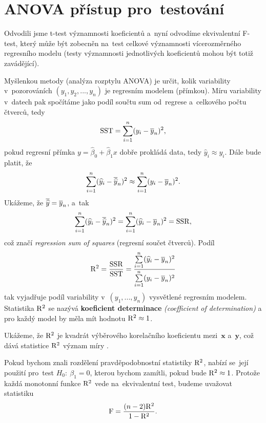 \section{ANOVA přístup pro~testování}
Odvodili jsme t-test významnosti koeficientů a~nyní odvodíme ekvivalentní F-test, který může být zobecněn na~test celkové významnosti vícerozměrného regresního modelu (testy významnosti jednotlivých koeficientů mohou být totiž zavádějící).

Myšlenkou metody (analýza rozptylu ANOVA) je určit, kolik variability v~pozorováních $(y_1,y_2,...,y_n)$ je  regresním modelem (přímkou). Míru variability v~datech pak spočítáme jako podíl součtu sum od~regrese a~celkového počtu čtverců, tedy
 $$ \mathrm{SST} = \sum\limits_{i=1}^{n}(y_i-\overline{y}_n)^2, $$
pokud regresní přímka $y = \widehat{\beta}_0+\widehat{\beta}_1 x$ dobře prokládá data, tedy $\widehat{y}_i\approx y_i$. Dále bude platit, že
 $$ \sum\limits_{i=1}^{n} (\widehat{y}_i-\overline{\widehat{y}}_n)^2\approx\sum\limits_{i=1}^{n} (y_i-\overline{y}_n)^2. $$
Ukážeme, že $\overline{\widehat{y}} = \overline{y}_n$, a~tak
 $$ \sum\limits_{i=1}^{n} (\widehat{y}_i-\overline{\widehat{y}}_n)^2 = \sum\limits_{i=1}^{n} (\widehat{y}_i-\overline{y}_n)^2 = \mathrm{SSR}, $$ což značí \textit{regression sum of squares} (regresní součet čtverců). Podíl
 $$ \mathrm{R}^2 = \frac{\mathrm{SSR}}{\mathrm{SST}} = \frac{\sum\limits_{i=1}^{n} (\widehat{y}_i-\overline{y}_n)^2}{\sum\limits_{i=1}^{n} (y_i-\overline{y}_n)^2} $$ tak vyjadřuje podíl variability v~$(y_1,...,y_n)$ vysvětlené regresním modelem. Statistika $\mathrm{R}^2$ se nazývá \textbf{koeficient determinace} \textit{(coefficient of determination)} a pro každý model by měla mít hodnotu $\mathrm{R}^2\approx 1$.

Ukážeme, že $\mathrm{R}^2$ je kvadrát výběrového korelačního koeficientu mezi~$\textbf{x}$ a~$\textbf{y}$, což dává statistice $\mathrm{R}^2$ význam míry .

Pokud bychom znali rozdělení pravděpodobnostní statistiky $\mathrm{R}^2$, nabízí se~její použití pro~test $H_0:~\beta_1 = 0$, kterou bychom zamítli, pokud bude $\mathrm{R}^2\approx1$. Protože každá monotonní funkce $\mathrm{R}^2$ vede na~ekvivalentní test, budeme uvažovat statistiku 
\begin{equation}
	\mathrm{F} = \frac{(n-2)\mathrm{R}^2}{1-\mathrm{R}^2}. \label{Definice F}
	\end{equation}

